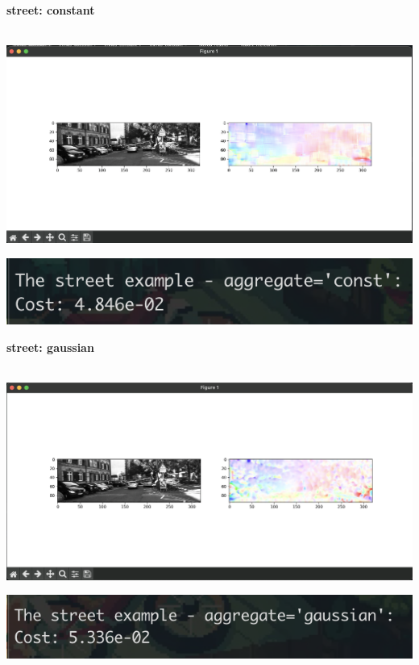 \documentclass[12pt]{article}
\begin{document}
\vspace{1em}

\textbf{street: constant} \\ \\
\begin{minipage}{0.49\textwidth}
    \centering
    \includegraphics[width=\textwidth]{./problem2_flow/street_constant_image.png}
\end{minipage}
\hfill
\begin{minipage}{0.49\textwidth}
    \centering
    \includegraphics[width=\textwidth]{./problem2_flow/street_constant_result.png}
\end{minipage}

\vspace{1em}

\textbf{street: gaussian} \\ \\
\begin{minipage}{0.49\textwidth}
    \centering
    \includegraphics[width=\textwidth]{./problem2_flow/street_gaussian_image.png}
\end{minipage}
\hfill
\begin{minipage}{0.49\textwidth}
    \centering
    \includegraphics[width=\textwidth]{./problem2_flow/street_gaussian_result.png}
\end{minipage}
\end{document}
